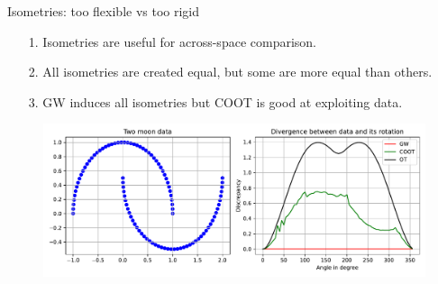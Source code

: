\documentclass{beamer}
\begin{document}
\begin{frame}{Isometries: too flexible vs too rigid}
\scriptsize

\begin{enumerate}
  \item[1.] Isometries are useful for across-space comparison.
  \item[2.] All isometries are created equal, but some are more equal than others.
  \item[3.] GW induces all isometries but COOT is good at exploiting data.
\end{enumerate}
\begin{figure}
    \centering
    \includegraphics[width=1.\linewidth, keepaspectratio=true]{OT_new/div_vs_angle.pdf}
\end{figure}

\end{frame}
\end{document}

